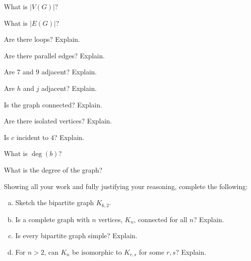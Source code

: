 \documentclass[12pt,letterpaper]{exam}
\begin{document}
\begin{questions}
\begin{2enumerate}
\item What is $|V(G)|$?
\item What is $|E(G)|$?
\item Are there loops? Explain. 
\item Are there parallel edges? Explain. 
\item Are $7$ and $9$ adjacent? Explain. 
\item Are $h$ and $j$ adjacent? Explain. 
\item Is the graph connected? Explain. 
\item Are there isolated vertices? Explain. 
\item Is $c$ incident to $4$? Explain. 
\item What is $\deg(b)$?
\item What is the degree of the graph?
\end{2enumerate}



\newpage



\newpage
\question[10] Showing all your work and fully justifying your reasoning, complete the following:
	\begin{enumerate}[(a)]
	\item Sketch the bipartite graph $K_{6,2}$.
	\item Is a complete graph with $n$ vertices, $K_n$, connected for all $n$? Explain. 
	\item Is every bipartite graph simple? Explain. 
	\item For $n > 2$, can $K_n$ be isomorphic to $K_{r, s}$ for some $r, s$? Explain. 
	\end{enumerate}



\newpage




\end{questions}
\end{document}
